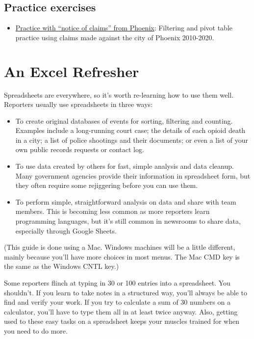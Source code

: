 \documentclass[
  letterpaper,
  DIV=11,
  numbers=noendperiod]{scrreprt}
\providecommand{\tightlist}{%
  \setlength{\itemsep}{0pt}\setlength{\parskip}{0pt}}\usepackage{longtable,booktabs,array}
\begin{document}
\hypertarget{practice-exercises}{%
\section{Practice exercises}\label{practice-exercises}}

\begin{itemize}
\tightlist
\item
  \href{xl-practice-noc.html}{Practice with ``notice of claims'' from
  Phoenix}: Filtering and pivot table practice using claims made against
  the city of Phoenix 2010-2020.
\end{itemize}


\hypertarget{an-excel-refresher}{%
\chapter{An Excel Refresher}\label{an-excel-refresher}}

Spreadsheets are everywhere, so it's worth re-learning how to use them
well. Reporters usually use spreadsheets in three ways:

\begin{itemize}
\item
  To create original databases of events for sorting, filtering and
  counting. Examples include a long-running court case; the details of
  each opioid death in a city; a list of police shootings and their
  documents; or even a list of your own public records requests or
  contact log.
\item
  To use data created by others for fast, simple analysis and data
  cleanup. Many government agencies provide their information in
  spreadsheet form, but they often require some rejiggering before you
  can use them.
\item
  To perform simple, straightforward analysis on data and share with
  team members. This is becoming less common as more reporters learn
  programming languages, but it's still common in newsrooms to share
  data, especially through Google Sheets.
\end{itemize}

(This guide is done using a Mac. Windows machines will be a little
different, mainly because you'll have more choices in most menus. The
Mac CMD key is the same as the Windows CNTL key.)

Some reporters flinch at typing in 30 or 100 entries into a spreadsheet.
You shouldn't. If you learn to take notes in a structured way, you'll
always be able to find and verify your work. If you try to calculate a
sum of 30 numbers on a calculator, you'll have to type them all in at
least twice anyway. Also, getting used to these easy tasks on a
spreadsheet keeps your muscles trained for when you need to do more.
\end{document}
